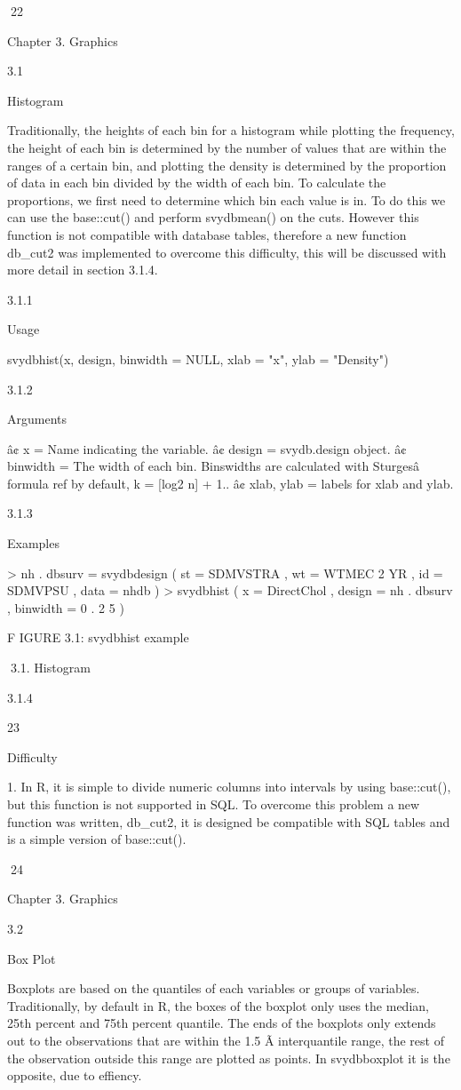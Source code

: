 22

Chapter 3. Graphics

3.1

Histogram

Traditionally, the heights of each bin for a histogram while plotting the frequency,
the height of each bin is determined by the number of values that are within the
ranges of a certain bin, and plotting the density is determined by the proportion of
data in each bin divided by the width of each bin.
To calculate the proportions, we first need to determine which bin each value is
in. To do this we can use the base::cut() and perform svydbmean() on the cuts.
However this function is not compatible with database tables, therefore a new function db_cut2 was implemented to overcome this difficulty, this will be discussed
with more detail in section 3.1.4.

3.1.1

Usage

svydbhist(x, design, binwidth = NULL, xlab = "x", ylab = "Density")

3.1.2

Arguments

â¢ x = Name indicating the variable.
â¢ design = svydb.design object.
â¢ binwidth = The width of each bin. Binswidths are calculated with Sturgesâ
formula ref by default, k = [log2 n] + 1..
â¢ xlab, ylab = labels for xlab and ylab.

3.1.3

Examples

> nh . dbsurv = svydbdesign ( st = SDMVSTRA , wt = WTMEC 2 YR ,
id = SDMVPSU , data = nhdb )
> svydbhist ( x = DirectChol , design = nh . dbsurv ,
binwidth = 0 . 2 5 )

F IGURE 3.1: svydbhist example

3.1. Histogram

3.1.4

23

Difficulty

1. In R, it is simple to divide numeric columns into intervals by using base::cut(),
but this function is not supported in SQL. To overcome this problem a new
function was written, db_cut2, it is designed be compatible with SQL tables
and is a simple version of base::cut().

24

Chapter 3. Graphics

3.2

Box Plot

Boxplots are based on the quantiles of each variables or groups of variables. Traditionally, by default in R, the boxes of the boxplot only uses the median, 25th percent
and 75th percent quantile. The ends of the boxplots only extends out to the observations that are within the 1.5 Ã interquantile range, the rest of the observation outside
this range are plotted as points. In svydbboxplot it is the opposite, due to effiency.

